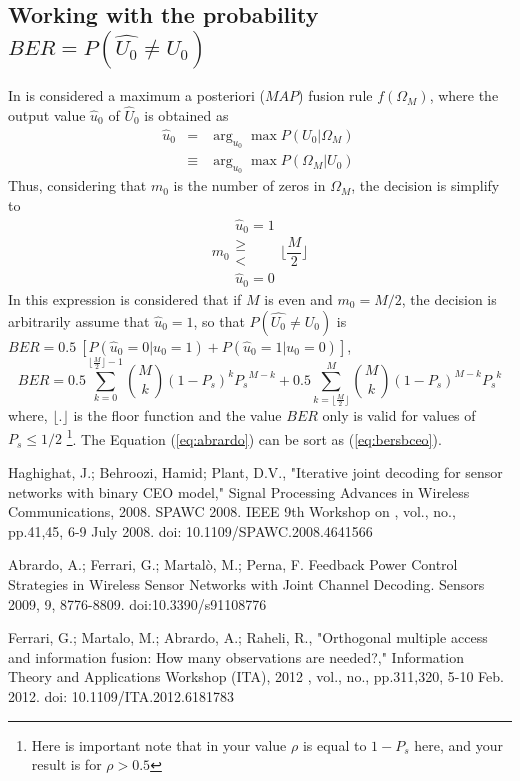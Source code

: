 \documentclass[a4paper,10pt]{article}
\begin{document}
\subsection{Working with the probability $BER=P(\hat{U_0} \neq U_0)$}
In \cite{Abrardo2009,Ferrari2012} is considered a maximum a posteriori ($MAP$) 
fusion rule $f(\Omega_M)$, 
where the output value $\hat{u}_0$ of $\hat{U}_0$
is obtained as
\begin{equation}
\begin{matrix}
 \hat{u}_0 & =      & \arg_{u_0} \max P(U_0|\Omega_M)\\
 ~         & \equiv & \arg_{u_0} \max P(\Omega_M|U_0)\
\end{matrix}
\end{equation}
Thus, considering that $m_0$ is the number of zeros in $\Omega_M$, the decision is simplify to 
\begin{equation}
m_0
\begin{matrix}
\hat{u}_0=1 \\
\geq \\
< \\
\hat{u}_0=0
\end{matrix}
\lfloor \frac{M}{2}\rfloor
\end{equation}
In this expression is considered that if  $M$ is even and $m_0=M/2$, the decision 
is arbitrarily assume that $\hat{u}_0 = 1$,
so that  $P(\hat{U_0} \neq U_0)$ is $BER=0.5~[ P(\hat{u}_0=0|u_0=1)+P(\hat{u}_0=1|u_0=0) ]$,
\begin{equation} \label{eq:abrardo}
 BER= 0.5 \sum_{k=0}^{\lfloor \frac{M}{2} \rfloor -1}  \binom{M}{k} {(1-P_s)}^{k}   {P_s}^{M-k} 
    + 0.5 \sum_{k=\lfloor \frac{M}{2}     \rfloor}^{M} \binom{M}{k} {(1-P_s)}^{M-k} {P_s}^{k}   
\end{equation}
where, $\lfloor . \rfloor$ is the floor function and the value $BER$ only is valid for
values of $P_s \leq 1/2$ 
\footnote{Here is important note that in \cite{Abrardo2009,Ferrari2012} your value $\rho$
is equal to $1-P_s$ here, and your result is for $\rho > 0.5$}. The Equation 
(\ref{eq:abrardo}) can be sort as (\ref{eq:bersbceo}).
 
 \begin{thebibliography}{99}
 
Haghighat, J.; Behroozi, Hamid; Plant, D.V., "Iterative joint decoding for sensor 
networks with binary CEO model," Signal Processing Advances in Wireless 
Communications, 2008. SPAWC 2008. IEEE 9th Workshop on , vol., no., pp.41,45, 
6-9 July 2008. doi: 10.1109/SPAWC.2008.4641566
 
Abrardo, A.; Ferrari, G.; Martalò, M.; Perna, F. Feedback Power Control Strategies in 
Wireless Sensor Networks with Joint Channel Decoding. Sensors 2009, 9, 8776-8809.
doi:10.3390/s91108776
 
Ferrari, G.; Martalo, M.; Abrardo, A.; Raheli, R., "Orthogonal multiple access 
and information fusion: How many observations are needed?," Information Theory and 
Applications Workshop (ITA), 2012 , vol., no., pp.311,320, 5-10 Feb. 2012.
doi: 10.1109/ITA.2012.6181783


 \end{thebibliography} 
\end{document}
